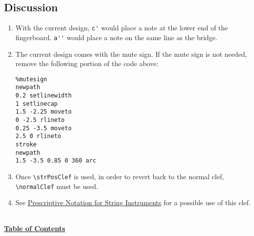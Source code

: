 \subsection{Discussion}
\begin{enumerate}
\item With the current design, \verb|c'| would place a note at the lower end of the fingerboard. \verb|a''| would place a note on the same line as the bridge. 

\item The current design comes with the mute sign. If the mute sign is not needed, remove the following portion of the code above:

\begin{verbatim}
%mutesign
newpath
0.2 setlinewidth
1 setlinecap
1.5 -2.25 moveto
0 -2.5 rlineto
0.25 -3.5 moveto
2.5 0 rlineto
stroke
newpath
1.5 -3.5 0.85 0 360 arc
\end{verbatim}

\item Once \verb|\strPosClef| is used, in order to revert back to the normal clef, \verb|\normalClef| must be used.
\item See \hyperref[sec:comb_strings]{Prescriptive Notation for String Instruments} for a possible use of this clef.
\end{enumerate}

\hyperref[sec:toc]{\\ \textbf{Table of Contents}}

\vfill \break


